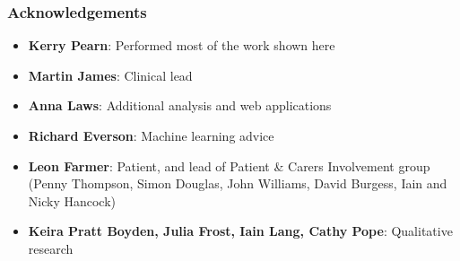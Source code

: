 \begin{frame}
\frametitle{Acknowledgements}

\begin{itemize}
    \setlength{\itemsep}{4mm}
    \item \textbf{Kerry Pearn}: Performed most of the work shown here
    \item \textbf{Martin James}: Clinical lead
    \item \textbf{Anna Laws}: Additional analysis and web applications
    \item \textbf{Richard Everson}: Machine learning advice
    \item \textbf{Leon Farmer}: Patient, and lead of Patient & Carers Involvement group (Penny Thompson, Simon Douglas, John Williams, David Burgess, Iain and Nicky Hancock)
    \item \textbf{Keira Pratt Boyden, Julia Frost, Iain Lang, Cathy Pope}: Qualitative research 

\end{itemize}
\end{frame}